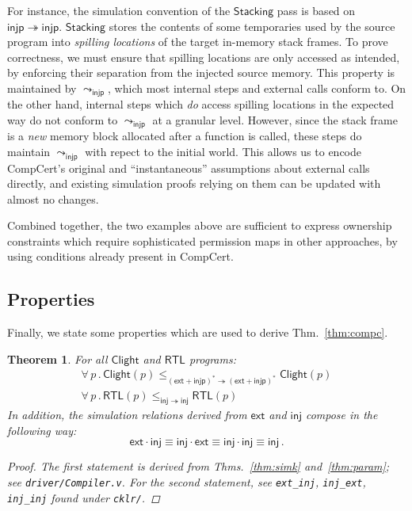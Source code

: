 \documentclass[11pt,oneside,draft]{book}
\newtheorem{theorem}{Theorem}[chapter]
\theoremstyle{definition}
\newcommand{\kw}[1]{\ensuremath{ \mathsf{#1} }}
\begin{document}
For instance,
the simulation convention of the \kw{Stacking} pass
is based on $\kw{injp} \twoheadrightarrow \kw{injp}$.
\kw{Stacking} stores the contents of some
temporaries used by the source program
into \emph{spilling locations}
of the target in-memory stack frames.
To prove correctness,
we must ensure that spilling locations
are only accessed as intended,
by enforcing their separation
from the injected source memory.
%
This property is maintained by $\leadsto_\kw{injp}$,
which most internal steps and external calls conform to.
On the other hand,
internal steps which \emph{do} access spilling locations
in the expected way
do not conform to $\leadsto_\kw{injp}$ at a granular level.
However,
since the stack frame is a \emph{new}
memory block allocated after a function is called,
these steps do maintain $\leadsto_\kw{injp}$
with repect to the initial world.
This allows us to encode CompCert's original and
``instantaneous'' assumptions about external calls directly,
and existing simulation proofs relying on them
can be updated with almost no changes.

Combined together,
the two examples above are sufficient to express
ownership constraints which require
sophisticated permission maps in other approaches,
by using conditions already present in CompCert.


\subsection{Properties} \label{sec:cklr-props} %

Finally,
we state some properties which are used
to derive Thm.~\ref{thm:compc}.

\begin{theorem} \label{thm:cklr-props}
For all $\kw{Clight}$ and $\kw{RTL}$ programs:
\begin{gather*}
\forall \, p \,.\,
  \kw{Clight}(p)
  \le_{(\kw{ext} + \kw{injp})^* \twoheadrightarrow (\kw{ext} + \kw{injp})^*}
  \kw{Clight}(p) \\
\forall \, p \,.\,
  \kw{RTL}(p)
  \le_{\kw{inj} \twoheadrightarrow \kw{inj}}
  \kw{RTL}(p)
\end{gather*}
In addition,
the simulation relations derived from $\kw{ext}$ and $\kw{inj}$
compose in the following way:
\[
  \kw{ext} \cdot \kw{inj} \equiv
  \kw{inj} \cdot \kw{ext} \equiv
  \kw{inj} \cdot \kw{inj} \equiv
  \kw{inj} \,.
\]
\begin{proof}
The first statement is derived from
Thms.~\ref{thm:simk} and~\ref{thm:param};
see \texttt{driver/Compiler.v}.
For the second statement, see
\texttt{ext\_inj}, \texttt{inj\_ext}, \texttt{inj\_inj}
found under \texttt{cklr/}.
\end{proof}
\end{theorem}
\end{document}
